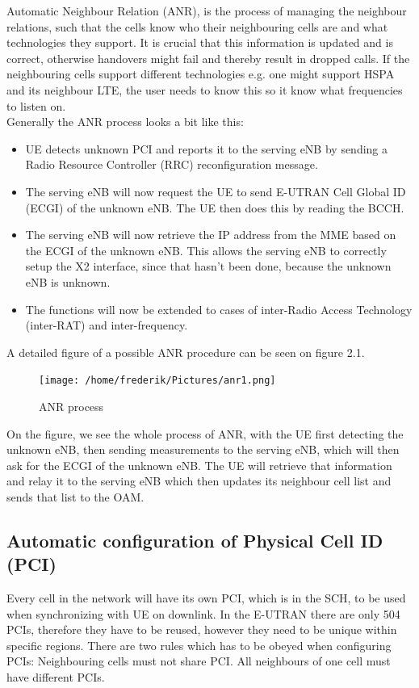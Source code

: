 \documentclass{report}
\begin{document}
Automatic Neighbour Relation (ANR), is the process of managing the neighbour relations, such that the cells know who their neighbouring cells are and what technologies they support. It is crucial that this information is updated and is correct, otherwise handovers might fail and thereby result in dropped calls. If the neighbouring cells support different technologies e.g. one might support HSPA and its neighbour LTE, the user needs to know this so it know what frequencies to listen on. \\ Generally the ANR process looks a bit like this:

\begin{itemize}
	\item UE detects unknown PCI and reports it to the serving eNB by sending a Radio Resource Controller (RRC) reconfiguration message.
	\item The serving eNB will now request the UE to send E-UTRAN Cell Global ID (ECGI) of the unknown eNB. The UE then does this by reading the BCCH. 
	\item The serving eNB will now retrieve the IP address from the MME based on the ECGI of the unknown eNB. This allows the serving eNB to correctly setup the X2 interface, since that hasn't been done, because the unknown eNB is unknown. 
	\item The functions will now be extended to cases of inter-Radio Access Technology (inter-RAT) and inter-frequency. \cite{Atayero2014}
\end{itemize}

A detailed figure of a possible ANR procedure can be seen on figure 2.1.

\begin{figure}[!ht]
	\centering
	\texttt{[image: /home/frederik/Pictures/anr1.png]}
	\caption{ANR process \cite{Roessler}}
\end{figure}

On the figure, we see the whole process of ANR, with the UE first detecting the unknown eNB, then sending measurements to the serving eNB, which will then ask for the ECGI of the unknown eNB. The UE will retrieve that information and relay it to the serving eNB which then updates its neighbour cell list and sends that list to the OAM. 
\subsection{Automatic configuration of Physical Cell ID (PCI)}
Every cell in the network will have its own PCI, which is in the SCH, to be used when synchronizing with UE on downlink. In the E-UTRAN there are only 504 PCIs, therefore they have to be reused, however they need to be unique within specific regions. There are two rules which has to be obeyed when configuring PCIs: 
Neighbouring cells must not share PCI. 
All neighbours of one cell must have different PCIs. \cite{Feng2008}
\end{document}
